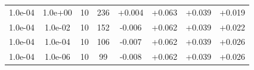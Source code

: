\documentclass[11pt,a4paper]{article}
\begin{document}
\begin{table}
{\begin{tabular}{*{8}c}


 1.0e-04 	 & 1.0e+00 	 & 10 & 236 	 & +0.004 & +0.063 & +0.039 & +0.019 \\ 
 1.0e-04 	 & 1.0e-02 	 & 10 & 152 	 & -0.006 & +0.062 & +0.039 & +0.022 \\ 
 1.0e-04 	 & 1.0e-04 	 & 10 & 106 	 & -0.007 & +0.062 & +0.039 & +0.026 \\ 
 1.0e-04 	 & 1.0e-06 	 & 10 & 99 	 & -0.008 & +0.062 & +0.039 & +0.026 \\
 


\end{tabular}}
\end{table}
\end{document}
